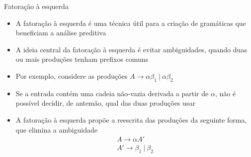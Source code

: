 \begin{frame}[fragile]{Fatoração à esquerda}

    \begin{itemize}
        \item A fatoração à esquerda é uma técnica útil para a criação de gramáticas que beneficiam a análise preditiva
        \pause

        \item A ideia central da fatoração à esquerda é evitar ambiguidades, quando duas ou mais produções tenham prefixos comuns
        \pause

        \item Por exemplo, considere as produções $A \to \alpha \beta_1\ |\ \alpha \beta_2$
        \pause

        \item Se a entrada contém uma cadeia não-vazia derivada a partir de $\alpha$, não é possível decidir, de antemão, qual das duas produções usar
        \pause

        \item A fatoração à esquerda propõe a reescrita das produções da seguinte forma, que elimina a ambiguidade
        \[
            \begin{array}{l}
                A \to \alpha A' \\
                A' \to \beta_1\ |\ \beta_2
            \end{array}
        \]
    \end{itemize}

\end{frame}

